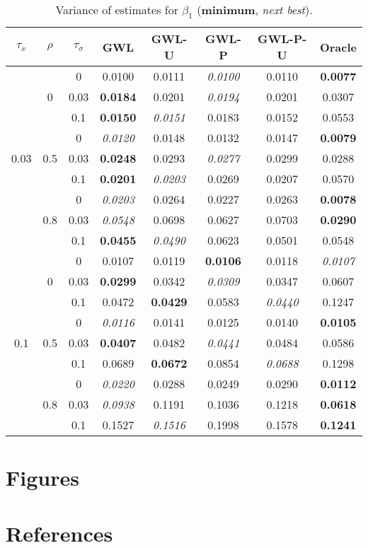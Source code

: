 \documentclass[authoryear, review, 11pt]{elsarticle}
\begin{document}
\begin{table}[ht]
\begin{center}
\begin{tabular}{ccc | ccccc}
$\tau_x$ & $\rho$ & $\tau_\sigma$ &  GWL & GWL-U & GWL-P & GWL-P-U & Oracle \\ 
  \hline
\multirow{9}{*}{0.03} & \multirow{3}{*}{0} & 0 & 0.0100 & 0.0111 & \emph{0.0100} & 0.0110 & \textbf{0.0077} \\ 
 &  & 0.03 &   \textbf{0.0184} & 0.0201 & \emph{0.0194} & 0.0201 & 0.0307 \\ 
 &  & 0.1 &   \textbf{0.0150} & \emph{0.0151} & 0.0183 & 0.0152 & 0.0553 \\ \cline{2-8}
 & \multirow{3}{*}{0.5} & 0 &   \emph{0.0120} & 0.0148 & 0.0132 & 0.0147 & \textbf{0.0079} \\ 
 &  & 0.03 &   \textbf{0.0248} & 0.0293 & \emph{0.0277} & 0.0299 & 0.0288 \\ 
 &  & 0.1 &   \textbf{0.0201} & \emph{0.0203} & 0.0269 & 0.0207 & 0.0570 \\ \cline{2-8}
 & \multirow{3}{*}{0.8} & 0 &   \emph{0.0203} & 0.0264 & 0.0227 & 0.0263 & \textbf{0.0078} \\ 
 &  & 0.03 &   \emph{0.0548} & 0.0698 & 0.0627 & 0.0703 & \textbf{0.0290} \\ 
 &  & 0.1 &   \textbf{0.0455} & \emph{0.0490} & 0.0623 & 0.0501 & 0.0548 \\ \cline{1-8}
\multirow{9}{*}{0.1} & \multirow{3}{*}{0} & 0 &   0.0107 & 0.0119 & \textbf{0.0106} & 0.0118 & \emph{0.0107} \\ 
 &  & 0.03 &   \textbf{0.0299} & 0.0342 & \emph{0.0309} & 0.0347 & 0.0607 \\ 
 &  & 0.1 &   0.0472 & \textbf{0.0429} & 0.0583 & \emph{0.0440} & 0.1247 \\ \cline{2-8}
 & \multirow{3}{*}{0.5} & 0 &   \emph{0.0116} & 0.0141 & 0.0125 & 0.0140 & \textbf{0.0105} \\ 
 &  & 0.03 &   \textbf{0.0407} & 0.0482 & \emph{0.0441} & 0.0484 & 0.0586 \\ 
 &  & 0.1 &   0.0689 & \textbf{0.0672} & 0.0854 & \emph{0.0688} & 0.1298 \\ \cline{2-8}
 & \multirow{3}{*}{0.8} & 0 &   \emph{0.0220} & 0.0288 & 0.0249 & 0.0290 & \textbf{0.0112} \\ 
 &  & 0.03 &   \emph{0.0938} & 0.1191 & 0.1036 & 0.1218 & \textbf{0.0618} \\ 
 &  & 0.1 &   0.1527 & \emph{0.1516} & 0.1998 & 0.1578 & \textbf{0.1241} \\ 
  \end{tabular}
\caption{Variance of estimates for $\beta_1$ (\textbf{minimum}, \emph{next best}).\label{varx}}
\end{center}
\end{table}


\section{Figures}






\section{References}


\end{document}

